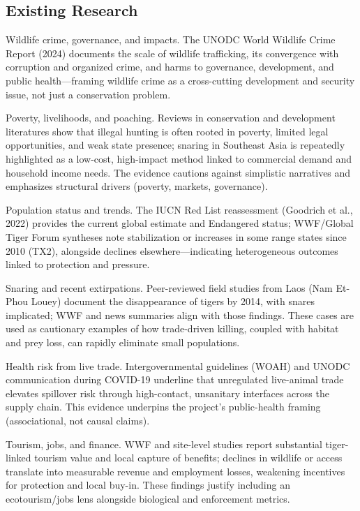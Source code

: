 \documentclass[
]{article}
\begin{document}
\subsection{Existing Research}\label{existing-research}

Wildlife crime, governance, and impacts. The UNODC World Wildlife Crime
Report (2024) documents the scale of wildlife trafficking, its
convergence with corruption and organized crime, and harms to
governance, development, and public health---framing wildlife crime as a
cross-cutting development and security issue, not just a conservation
problem.

Poverty, livelihoods, and poaching. Reviews in conservation and
development literatures show that illegal hunting is often rooted in
poverty, limited legal opportunities, and weak state presence; snaring
in Southeast Asia is repeatedly highlighted as a low-cost, high-impact
method linked to commercial demand and household income needs. The
evidence cautions against simplistic narratives and emphasizes
structural drivers (poverty, markets, governance).

Population status and trends. The IUCN Red List reassessment (Goodrich
et al., 2022) provides the current global estimate and Endangered
status; WWF/Global Tiger Forum syntheses note stabilization or increases
in some range states since 2010 (TX2), alongside declines
elsewhere---indicating heterogeneous outcomes linked to protection and
pressure.

Snaring and recent extirpations. Peer-reviewed field studies from Laos
(Nam Et-Phou Louey) document the disappearance of tigers by 2014, with
snares implicated; WWF and news summaries align with those findings.
These cases are used as cautionary examples of how trade-driven killing,
coupled with habitat and prey loss, can rapidly eliminate small
populations.

Health risk from live trade. Intergovernmental guidelines (WOAH) and
UNODC communication during COVID-19 underline that unregulated
live-animal trade elevates spillover risk through high-contact,
unsanitary interfaces across the supply chain. This evidence underpins
the project's public-health framing (associational, not causal claims).

Tourism, jobs, and finance. WWF and site-level studies report
substantial tiger-linked tourism value and local capture of benefits;
declines in wildlife or access translate into measurable revenue and
employment losses, weakening incentives for protection and local buy-in.
These findings justify including an ecotourism/jobs lens alongside
biological and enforcement metrics.
\end{document}
